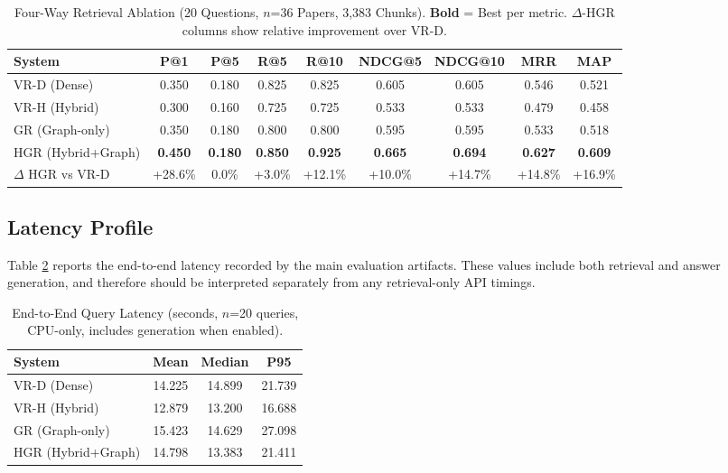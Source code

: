 \documentclass[conference,10pt,twocolumn]{IEEEtran}
\begin{document}
\begin{table}[t]
\centering
\caption{Four-Way Retrieval Ablation (20 Questions, $n$=36 Papers, 3,383 Chunks). \textbf{Bold} = Best per metric. $\Delta$-HGR columns show relative improvement over VR-D.}
\label{tab:retrieval}
\begin{tabular}{lcccccccc}
\toprule
System & P@1 & P@5 & R@5 & R@10 & NDCG@5 & NDCG@10 & MRR & MAP \\
\midrule
VR-D (Dense)         & 0.350 & 0.180 & 0.825 & 0.825 & 0.605 & 0.605 & 0.546 & 0.521 \\
VR-H (Hybrid)        & 0.300 & 0.160 & 0.725 & 0.725 & 0.533 & 0.533 & 0.479 & 0.458 \\
GR (Graph-only)      & 0.350 & 0.180 & 0.800 & 0.800 & 0.595 & 0.595 & 0.533 & 0.518 \\
HGR (Hybrid+Graph)   & \textbf{0.450} & \textbf{0.180} & \textbf{0.850} & \textbf{0.925} & \textbf{0.665} & \textbf{0.694} & \textbf{0.627} & \textbf{0.609} \\
\midrule
$\Delta$ HGR vs VR-D & +28.6\% & 0.0\% & +3.0\% & +12.1\% & +10.0\% & +14.7\% & +14.8\% & +16.9\% \\
\bottomrule
\end{tabular}
\end{table}

\subsection{Latency Profile}

Table \ref{tab:latency} reports the end-to-end latency recorded by the main evaluation artifacts. These values include both retrieval and answer generation, and therefore should be interpreted separately from any retrieval-only API timings.

\begin{table}[t]
\centering
\caption{End-to-End Query Latency (seconds, $n$=20 queries, CPU-only, includes generation when enabled).}
\label{tab:latency}
\begin{tabular}{lccc}
\toprule
System & Mean & Median & P95 \\
\midrule
VR-D (Dense)       & 14.225 & 14.899 & 21.739 \\
VR-H (Hybrid)      & 12.879 & 13.200 & 16.688 \\
GR (Graph-only)    & 15.423 & 14.629 & 27.098 \\
HGR (Hybrid+Graph) & 14.798 & 13.383 & 21.411 \\
\bottomrule
\end{tabular}
\end{table}
\end{document}
